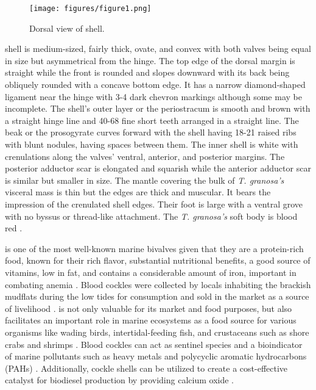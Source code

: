 \begin{figure}[!htbp]
	\centering
	\texttt{[image: figures/figure1.png]}
	\caption{Dorsal view of \Tegillarcagranosa shell.}
\end{figure}

\textit{\Tgranosa} shell is medium-sized, fairly thick, ovate, and convex with both valves being equal in size but asymmetrical from the hinge. The top edge of the dorsal margin is straight while the front is rounded and slopes downward with its back being obliquely rounded with a concave bottom edge. It has a narrow diamond-shaped ligament near the hinge with 3-4 dark chevron markings although some may be incomplete. The shell’s outer layer or the periostracum is smooth and brown with a straight hinge line and 40-68 fine short teeth arranged in a straight line. The beak or the prosogyrate curves forward with the shell having 18-21 raised ribs with blunt nodules, having spaces between them. The inner shell is white with crenulations along the valves' ventral, anterior, and posterior margins. The posterior adductor scar is elongated and squarish while the anterior adductor scar is similar but smaller in size. The mantle covering the bulk of \textit{T. granosa’s} visceral mass is thin but the edges are thick and muscular. It bears the impression of the crenulated shell edges. Their foot is large with a ventral grove with no byssus or thread-like attachment. The  \textit{T. granosa’s} soft body is blood red \cite{narasimham1988}.  

\Tgranosa is one of the most well-known marine bivalves given that they are a protein-rich food, known for their rich flavor, substantial nutritional benefits, a good source of vitamins, low in fat, and contains a considerable amount of iron, important in combating anemia \cite{zha2022}. Blood cockles were collected by locals inhabiting the brackish mudflats during the low tides for consumption and sold in the market as a source of livelihood \cite{miranda2023}. \Tgranosa is not only valuable for its market and food purposes, but also facilitates an important role in marine ecosystems as a food source for various organisms like wading birds, intertidal-feeding fish, and crustaceans such as shore crabs and shrimps \cite{burdon2014}. Blood cockles can act as sentinel species and a bioindicator of marine pollutants such as heavy metals \cite{ishak2016} and polycyclic aromatic hydrocarbons (PAHs) \cite{sany2014}. Additionally, cockle shells can be utilized to create a cost-effective catalyst for biodiesel production by providing calcium oxide \cite{boey2011waste}.

